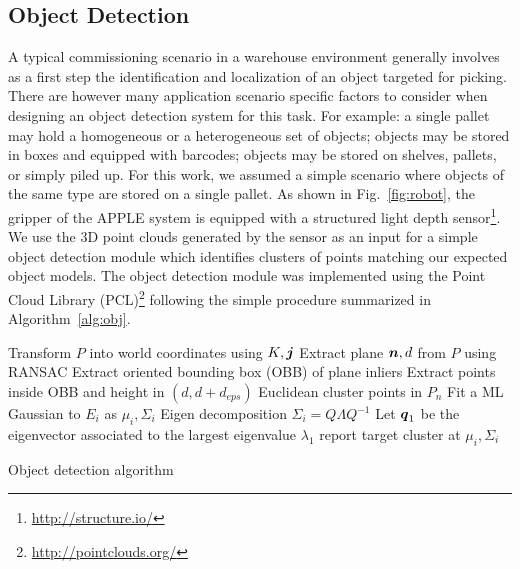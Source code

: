 \subsection{Object Detection}
\label{subsec:obj_det}
%
A typical commissioning scenario in a warehouse environment generally involves as a first step the
identification and localization of an object targeted for picking. There are however many
application scenario specific factors to consider when designing an object detection system for this
task. For example: a single pallet may hold a homogeneous or a heterogeneous set of objects; objects
may be stored in boxes and equipped with barcodes; objects may be stored on shelves, pallets, or
simply piled up. For this work, we assumed a simple scenario where objects of the same type are
stored on a single pallet. As shown in Fig.~\ref{fig:robot}, the gripper of the APPLE system is
equipped with a structured light depth sensor\footnote{\url{http://structure.io/}}. We use the 3D
point clouds generated by the sensor as an input for a simple object detection module which
identifies clusters of points matching our expected object models. The object detection module was
implemented using the Point Cloud Library (PCL)\footnote{\url{http://pointclouds.org/}} following
the simple procedure summarized in Algorithm~\ref{alg:obj}.
\begin{algorithm}[t!]
{}
Transform $P$ into world coordinates using $K,\mbox{\boldmath $j$}$\;
 {
    Extract plane $\mbox{\boldmath $n$},d$ from $P$ using RANSAC\;
}
Extract oriented bounding box (OBB) of plane inliers\;
Extract points inside OBB and height in $(d,d+d_{eps})$\;
Euclidean cluster points in $P_n$\;
 {
    Fit a ML Gaussian to $E_i$ as $\mu_i,\Sigma_i$\;
    Eigen decomposition $\Sigma_i=Q\Lambda Q^{-1}$\;
    Let $\mbox{\boldmath $q$}_1$ be the eigenvector associated to the largest eigenvalue $\lambda_1$\;
     {report target cluster at $\mu_i,\Sigma_i$\;}
}
\caption{Object detection algorithm}\label{alg:obj}
\end{algorithm}
%
\par
